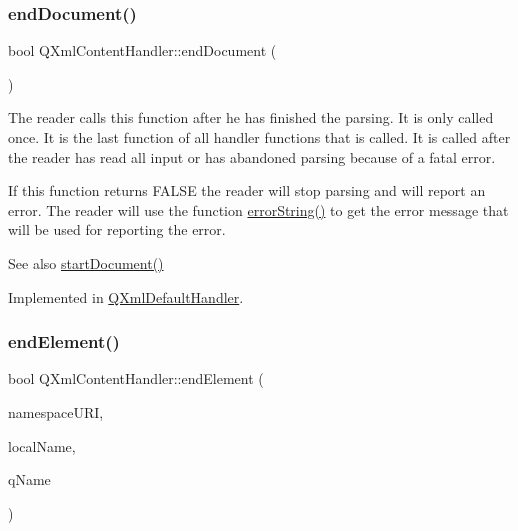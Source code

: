 \mbox{\label{class_q_xml_content_handler_a534bd1e4627e65340eb17d90d1ab1c12}} 
\subsubsection{\texorpdfstring{endDocument()}{endDocument()}}
{\footnotesize\ttfamily bool Q\+Xml\+Content\+Handler\+::end\+Document (\begin{DoxyParamCaption}{ }\end{DoxyParamCaption})\hspace{0.3cm}{\ttfamily [pure virtual]}}

The reader calls this function after he has finished the parsing. It is only called once. It is the last function of all handler functions that is called. It is called after the reader has read all input or has abandoned parsing because of a fatal error.

If this function returns F\+A\+L\+SE the reader will stop parsing and will report an error. The reader will use the function \mbox{\hyperlink{class_q_xml_content_handler_adba96547bad1cf1b009dbfb7b7c571be}{error\+String()}} to get the error message that will be used for reporting the error.

\begin{DoxySeeAlso}{See also}
\mbox{\hyperlink{class_q_xml_content_handler_aaca36268e66c9a56257e38bce18ae4d2}{start\+Document()}} 
\end{DoxySeeAlso}


Implemented in \mbox{\hyperlink{class_q_xml_default_handler_a57ed6d87a89653619ff0d56078c52061}{Q\+Xml\+Default\+Handler}}.

\mbox{\label{class_q_xml_content_handler_af0abc06326798a6e522f91e6174b7b9e}} 
\subsubsection{\texorpdfstring{endElement()}{endElement()}}
{\footnotesize\ttfamily bool Q\+Xml\+Content\+Handler\+::end\+Element (\begin{DoxyParamCaption}\item[{const \mbox{\hyperlink{class_q_string}{Q\+String}} \&}]{namespace\+U\+RI,  }\item[{const \mbox{\hyperlink{class_q_string}{Q\+String}} \&}]{local\+Name,  }\item[{const \mbox{\hyperlink{class_q_string}{Q\+String}} \&}]{q\+Name }\end{DoxyParamCaption})\hspace{0.3cm}{\ttfamily [pure virtual]}}

